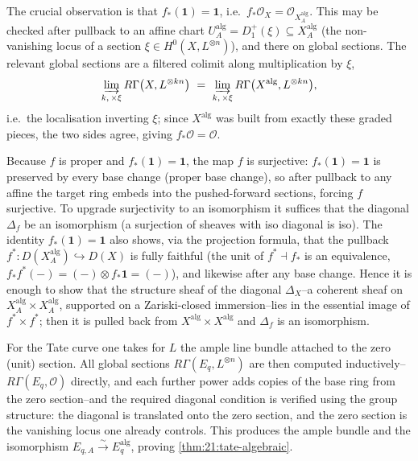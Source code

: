 \begin{remark}[$f_*\mathcal O=\mathcal O$]
\label{rmk:21:pushforward-unit}
The crucial observation is that $f_*(\mathbf 1)=\mathbf 1$, i.e.\
$f_*\mathcal O_X=\mathcal O_{X^{\mathrm{alg}}_A}$. This may be checked after
pullback to an affine chart $U^{\mathrm{alg}}_A=D^{+}_1(\xi)\subseteq
X^{\mathrm{alg}}_A$ (the non-vanishing locus of a section
$\xi\in H^0(X,L^{\otimes n})$), and there on global sections. The relevant global
sections are a filtered colimit along multiplication by $\xi$,
\begin{equation*}
\varinjlim_{k,\,\times\xi} R\Gamma\bigl(X,L^{\otimes kn}\bigr)\ =\
\varinjlim_{k,\,\times\xi} R\Gamma\bigl(X^{\mathrm{alg}},L^{\otimes kn}\bigr),
\end{equation*}
i.e.\ the localisation inverting $\xi$; since $X^{\mathrm{alg}}$ was built from
exactly these graded pieces, the two sides agree, giving $f_*\mathcal O=\mathcal O$.
\end{remark}

\begin{remark}[From $f_*\mathcal O=\mathcal O$ to an isomorphism]
\label{rmk:21:iso-criterion}
\ts{01:41:24}
Because $f$ is proper and $f_*(\mathbf 1)=\mathbf 1$, the map $f$ is surjective:
$f_*(\mathbf 1)=\mathbf 1$ is preserved by every base change (proper base change),
so after pullback to any affine the target ring embeds into the pushed-forward
sections, forcing $f$ surjective. To upgrade surjectivity to an isomorphism it
suffices that the diagonal $\Delta_f$ be an isomorphism (a surjection of sheaves
with iso diagonal is iso). The identity $f_*(\mathbf 1)=\mathbf 1$ also shows,
via the projection formula, that the pullback
$f^{*}\colon D(X^{\mathrm{alg}}_A)\hookrightarrow D(X)$ is fully faithful (the
unit of $f^{*}\dashv f_{*}$ is an equivalence, $f_*f^{*}(-)=(-)\otimes f_*\mathbf 1
=(-)$), and likewise after any base change. Hence it is enough to show that the
structure sheaf of the diagonal $\Delta_X$--a coherent sheaf on
$X^{\mathrm{alg}}_A\times X^{\mathrm{alg}}_A$, supported on a Zariski-closed
immersion--lies in the essential image of $f^{*}\times f^{*}$; then it is pulled
back from $X^{\mathrm{alg}}\times X^{\mathrm{alg}}$ and $\Delta_f$ is an
isomorphism.
\end{remark}

\begin{remark}
\label{rmk:21:tate-algebraisation}
\ts{01:47:07}
For the Tate curve one takes for $L$ the ample line bundle attached to the zero
(unit) section. All global sections $R\Gamma(E_q,L^{\otimes n})$ are then
computed inductively--$R\Gamma(E_q,\mathcal O)$ directly, and each further power
adds copies of the base ring from the zero section--and the required diagonal
condition is verified using the group structure: the diagonal is translated onto
the zero section, and the zero section is the vanishing locus one already
controls. This produces the ample bundle and the isomorphism
$E_{q,A}\xrightarrow{\sim}E_q^{\mathrm{alg}}$, proving
\cref{thm:21:tate-algebraic}.
\end{remark}

